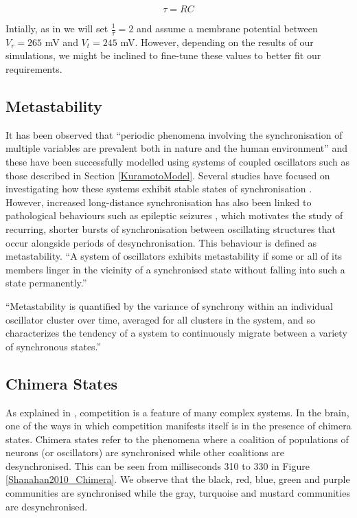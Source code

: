 \documentclass[a4paper,11pt]{article}
\begin{document}
\begin{equation} \label{eq:tau}
\tau = RC
\end{equation}

Intially, as in \cite{Bhowmik2013} we will set $\frac{1}{\tau} = 2$ and assume a membrane potential between $V_r = 265$ mV and $V_t = 245$ mV. However, depending on the results of our simulations, we might be inclined to fine-tune these values to better fit our requirements.

\subsection{Metastability}

It has been observed that ``periodic phenomena involving the synchronisation of multiple variables are prevalent both in nature and the human environment'' \cite{Shanahan2010} and these have been successfully modelled using systems of coupled oscillators such as those described in Section \ref{KuramotoModel}. Several studies have focused on investigating how these systems exhibit stable states of synchronisation \cite{Acebron2005}. However, increased long-distance synchronisation has also been linked to pathological behaviours such as epileptic seizures \cite{Arthuis2009}, which motivates the study of recurring, shorter bursts of synchronisation between oscillating structures that occur alongside periods of desynchronisation. This behaviour is defined as metastability. ``A system of oscillators exhibits metastability if some or all of its members linger in the vicinity of a synchronised state without falling into such a state permanently.'' \cite{Shanahan2010}


``Metastability is quantified by the variance of synchrony within an individual oscillator cluster over time, averaged for all clusters in the system, and so characterizes the tendency of a system to continuously migrate between a variety of synchronous states.'' \cite{Bhowmik2013}

\subsection{Chimera States}
\label{sec:bg:chimera}

As explained in \cite{Shanahan2010}, competition is a feature of many complex systems. In the brain, one of the ways in which competition manifests itself is in the presence of chimera states. Chimera states refer to the phenomena where a coalition of populations of neurons (or oscillators) are synchronised while other coalitions are desynchronised. This can be seen from milliseconds 310 to 330 in Figure \ref{Shanahan2010_Chimera}. We observe that the black, red, blue, green and purple communities are synchronised while the gray, turquoise and mustard communities are desynchronised.
\end{document}
